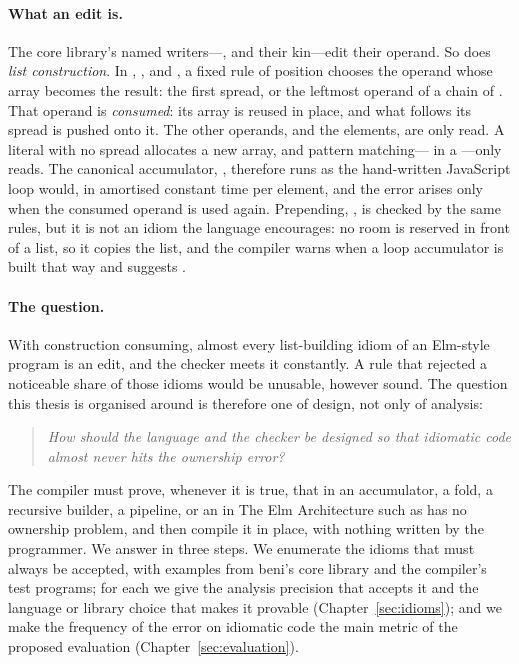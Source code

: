 \paragraph{What an edit is.} The core library's named writers---,  and
their kin---edit their operand. So does \emph{list construction}. In \code{[ …acc, x ]},
\code{[ …acc, …ys ]},  and \code{[ x, …acc ]}, a fixed rule of position chooses the
operand whose array becomes the result: the first spread, or the leftmost operand of a chain of \code{++}. That operand
is \emph{consumed}: its array is reused in place, and what follows its spread is pushed onto it. The
other operands, and the elements, are only read. A literal with no spread allocates a new array, and
pattern matching---\code{[ x, …rest ]} in a ---only reads. The canonical accumulator,
\code{[ …acc, x ]}, therefore runs as the hand-written JavaScript loop would, in amortised constant time
per element, and the error arises only when the consumed operand is used again. Prepending,
\code{[ x, …acc ]}, is checked by the same rules, but it is not an idiom the language encourages: no room
is reserved in front of a list, so it copies the list, and the compiler warns when a loop accumulator is
built that way and suggests \code{[ …acc, x ]}.

\paragraph{The question.} With construction consuming, almost every list-building idiom of an
Elm-style program is an edit, and the checker meets it constantly. A rule that rejected a noticeable
share of those idioms would be unusable, however sound. The question this thesis is organised around
is therefore one of design, not only of analysis:

\begin{quote}
\emph{How should the language and the checker be designed so that idiomatic code almost never hits the
ownership error?}
\end{quote}

The compiler must prove, whenever it is true, that \code{[ …acc, x ]} in an accumulator, a fold, a
recursive builder, a pipeline, or an  in The Elm Architecture such as
 has no ownership problem, and then compile it in
place, with nothing written by the programmer. We answer in three steps. We enumerate the idioms that
must always be accepted, with examples from beni's core library and the compiler's test programs; for
each we give the analysis precision that accepts it and the language or library choice that makes it
provable (Chapter~\ref{sec:idioms}); and we make the frequency of the error on idiomatic code the main
metric of the proposed evaluation (Chapter~\ref{sec:evaluation}).

